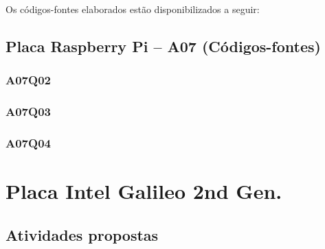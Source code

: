 \documentclass[
	12pt,				%
	openright,			%
  oneside,     %
	a4paper,			%
	english,			%
	french,				%
	spanish,			%
	brazil				%
	]{abntex2}
\begin{document}
\newpage

Os códigos-fontes elaborados estão disponibilizados a seguir:

\section*{Placa Raspberry Pi -- A07 (Códigos-fontes)}
\label{sec:RaspberryPi-A07Q02}
\subsection*{A07Q02}

\subsection*{A07Q03}

\subsection*{A07Q04}




%
%


\chapter{Placa Intel Galileo 2nd Gen.} %
\label{cha:8-Placa-Intel-Galileo}

\section{Atividades propostas} %
\label{sec:RPlaca-Intel-Galileo-atividades_propostas}
\end{document}
